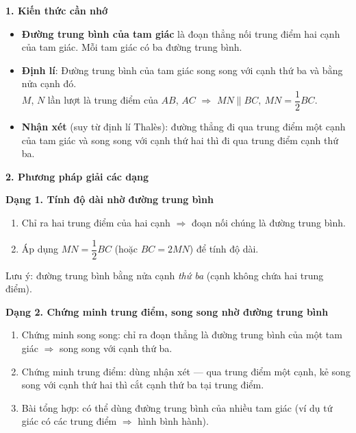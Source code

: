 \textbf{1. Kiến thức cần nhớ}
\begin{itemize}
\item \textbf{Đường trung bình của tam giác} là đoạn thẳng nối trung điểm hai cạnh của tam giác. Mỗi tam giác có ba đường trung bình.
\item \textbf{Định lí}: Đường trung bình của tam giác song song với cạnh thứ ba và bằng nửa cạnh đó.\\
$M$, $N$ lần lượt là trung điểm của $AB$, $AC$ $\Rightarrow$ $\boxed{MN\parallel BC,\ MN=\dfrac12BC}$.
\item \textbf{Nhận xét} (suy từ định lí Thalès): đường thẳng đi qua trung điểm một cạnh của tam giác và song song với cạnh thứ hai thì đi qua trung điểm cạnh thứ ba.
\end{itemize}

\textbf{2. Phương pháp giải các dạng}

\textbf{Dạng 1. Tính độ dài nhờ đường trung bình}
\begin{enumerate}
\item Chỉ ra hai trung điểm của hai cạnh $\Rightarrow$ đoạn nối chúng là đường trung bình.
\item Áp dụng $MN=\dfrac12BC$ (hoặc $BC=2MN$) để tính độ dài.
\end{enumerate}
Lưu ý: đường trung bình bằng nửa cạnh \textit{thứ ba} (cạnh không chứa hai trung điểm).

\textbf{Dạng 2. Chứng minh trung điểm, song song nhờ đường trung bình}
\begin{enumerate}
\item Chứng minh song song: chỉ ra đoạn thẳng là đường trung bình của một tam giác $\Rightarrow$ song song với cạnh thứ ba.
\item Chứng minh trung điểm: dùng nhận xét — qua trung điểm một cạnh, kẻ song song với cạnh thứ hai thì cắt cạnh thứ ba tại trung điểm.
\item Bài tổng hợp: có thể dùng đường trung bình của nhiều tam giác (ví dụ tứ giác có các trung điểm $\Rightarrow$ hình bình hành).
\end{enumerate}
